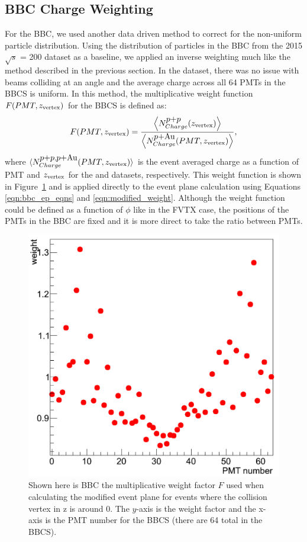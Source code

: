 \subsection{BBC Charge Weighting}
\label{sec:bbc_charge_weight}
For the BBC, we used another data driven method to correct for the non-uniform particle distribution. Using the distribution of particles in the BBC from the 2015 \pp $\sqrt{s}$ = 200 dataset as a baseline, we applied an inverse weighting much like the method described in the previous section. In the \pp dataset, there was no issue with beams colliding at an angle and the average charge across all 64 PMTs in the BBCS is uniform. In this method, the multiplicative weight function $F(PMT,z_{\rm vertex})$ for the BBCS is defined as:
\begin{equation}
F(PMT,z_{\rm vertex}) = \frac{\left<N^{\mbox{$p$+$p$}}_{Charge}(z_{\rm vertex})\right>}{\left<N^{\mbox{$p$+Au}}_{Charge}(PMT,z_{\rm vertex})\right>},
\end{equation}
where $\langle N^{\mbox{$p$+$p$},\mbox{$p$+Au}}_{Charge}(PMT,z_{\rm vertex})\rangle$ is the event averaged charge as a function of PMT and $z_{\rm vertex}$ for the \pp and \pau datasets, respectively. 
This weight function is shown in Figure~\ref{fig:bbc_weight_function} and is applied directly to the event plane calculation using Equations \ref{eqn:bbc_ep_eqns} and  \ref{eqn:modified_weight}. 
Although the weight function could be defined as a function of $\phi$ like in the FVTX case, the positions of the PMTs in the BBC are fixed and it is more direct to take the ratio between PMTs.

\begin{figure}[!ht]
\begin{center}
\includegraphics[width=0.5\linewidth]{figs/pmt_ratio_weight.png}
\caption{Shown here is BBC the multiplicative weight factor $F$ used when calculating the modified event plane for events where the collision vertex in z is around 0. The $y$-axis is the weight factor and the x-axis is the PMT number for the BBCS (there are 64 total in the BBCS). }
\label{fig:bbc_weight_function}
\end{center}
\end{figure}

